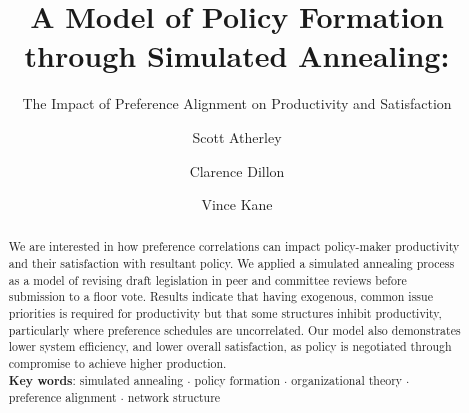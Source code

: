 \documentclass[pdftex,12pt,oribibl]{llncs}
\begin{document}
\title{A Model of Policy Formation through Simulated Annealing:}
\subtitle{The Impact of Preference Alignment on Productivity and Satisfaction}
\author{Scott Atherley \and Clarence Dillon \and Vince Kane}

\maketitle

%
%

\begin{abstract}
 We are interested in how preference correlations can impact policy-maker productivity and their satisfaction with resultant policy. 
 We applied a simulated annealing process as a model of revising draft legislation in peer and committee reviews before submission to a floor vote.
 Results indicate that having exogenous, common issue priorities is required for productivity but that some structures inhibit productivity, particularly where preference schedules are uncorrelated.
 Our model also demonstrates lower system efficiency, and lower overall satisfaction, as policy is negotiated through compromise to achieve higher production.\\
 
 \textbf{Key words}: simulated annealing $\cdot$ policy formation $\cdot$ organizational theory $\cdot$ preference alignment $\cdot$ network structure
\end{abstract}
\end{document}
